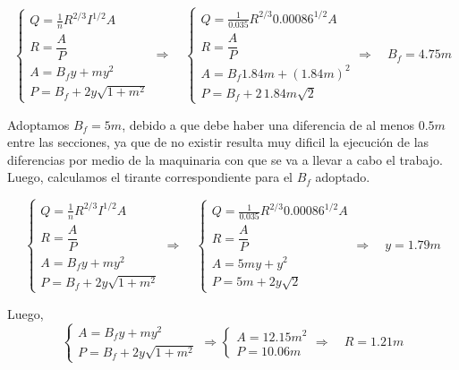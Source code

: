 \begin{equation*}
  \begin{cases}
    Q = \frac{1}{n} R^{2/3} I^{1/2} A \\
    R = \dfrac{A}{P} \\
    A = B_{f}y + m y^{2} \\
    P = B_{f} + 2 y \sqrt{1 + m^{2}}
  \end{cases}
  \Longrightarrow \quad
  \begin{cases}
    Q = \frac{1}{0.035} R^{2/3} 0.00086^{1/2} A \\
    R = \dfrac{A}{P} \\
    A = B_{f}1.84 m + (1.84 m)^2 \\
    P = B_{f} + 2 \, 1.84 m \sqrt{2}
  \end{cases}
  \Longrightarrow \quad
  B_{f} = 4.75 m
\end{equation*}

Adoptamos $B_{f} = 5 m$, debido a que debe haber una diferencia de al menos $0.5 m$ entre las secciones, ya que de no existir resulta
muy dificil la ejecución de las diferencias por medio de la maquinaria con que se va a llevar a cabo el trabajo.
Luego, calculamos el tirante correspondiente para el $B_{f}$ adoptado.

\begin{equation*}
  \begin{cases}
    Q = \frac{1}{n} R^{2/3} I^{1/2} A \\
    R = \dfrac{A}{P} \\
    A = B_{f}y + m y^{2} \\
    P = B_{f} + 2 y \sqrt{1 + m^{2}}
  \end{cases}
  \Longrightarrow \quad
  \begin{cases}
    Q = \frac{1}{0.035} R^{2/3} 0.00086^{1/2} A \\
    R = \dfrac{A}{P} \\
    A = 5 m y + y^2 \\
    P = 5 m + 2 y \sqrt{2}
  \end{cases}
  \Longrightarrow \quad
  y = 1.79 m
\end{equation*}

Luego,
\begin{equation*}
  \begin{cases}
    A = B_{f}y + m y^{2} \\
    P = B_{f} + 2 y \sqrt{1 + m^{2}}
  \end{cases}
  \Longrightarrow
  \begin{cases}
    A = 12.15 m^2 \\
    P = 10.06 m
  \end{cases}
  \Longrightarrow \quad
  R = 1.21 m
\end{equation*}


